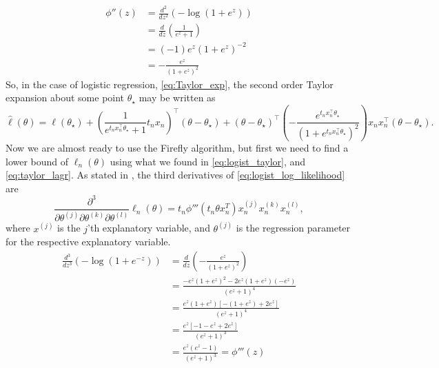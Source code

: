 \begin{equation}\label{eq:loglist_second_der}
    \begin{split}
       \phi''\left(z\right) & = \frac{d^2}{dz^2}\left(-\log\left(1 + e^z \right)\right) \\
        & = \frac{d}{dz} \left(\frac{1}{e^z +1}\right) \\
        & = \left(-1\right)e^z \left(1 + e^z\right)^{-2} \\
        & = -\frac{e^z}{\left(1 + e^z\right)^2} 
\end{split} 
\end{equation}
So, in the case of logistic regression, \eqref{eq:Taylor_exp}, the second order Taylor expansion about some point $\theta_{\star}$ may be written as 
\begin{equation}\label{eq:logist_taylor}
    \hat{\ell}\left(\theta\right)= \ell\left(\theta_{\star}\right) + \left(\frac{1}{e^{t_n x_n^{\top}\theta_{\star} } + 1} t_n x_n\right)^{\top}
    \left(\theta - \theta_{\star} \right) 
    + \left(\theta - \theta_{\star}\right)^{\top}
    \left(-\frac{e^{t_n x_n^{\top}\theta_{\star} }}{\left(1 + e^{t_n x_n^{\top}\theta_{\star} }\right)^2}\right)x_n x_n^{\top} \left(\theta - \theta_{\star}\right).  
\end{equation}{}
Now we are almost ready to use the Firefly algorithm, but first we need to find a lower bound of $\ell_n\left(\theta\right)$ using what we found in \eqref{eq:logist_taylor}, and \eqref{eq:taylor_lagr}.  
As stated in \cite{Bardenet:1}, the third derivatives of \eqref{eq:logist_log_likelihood} are 
\begin{equation}\label{eq:logist_third_der}
    \frac{\partial^3}{\partial\theta^{\left(j\right)}\partial \theta^{\left(k\right)}\partial\theta^{\left(l\right)}}  \ell_n\left(\theta\right)= t_n \phi'''\left(t_n\theta x_n^T\right) x_n^{\left(j\right)}x_n^{\left(k\right)}x_n^{\left(l\right)},
\end{equation} where $x^{\left(j\right)}$ is the $j$'th explanatory variable, and $\theta^{\left(j\right)}$ is the regression parameter for the respective explanatory variable. 
\begin{equation*}
\begin{split}
    \frac{d^3}{dz^3}\left( -\log\left(1 + e^{-z}\right)\right) &= \frac{d}{dz}\left( - \frac{e^z}{\left(1 + e^z\right)^2}\right) \\
    & = \frac{- e^z \left(1 + e^z\right)^2 - 2e^z\left(1 + e^z\right)\left(-e^z\right)}{\left(e^z + 1\right)^4}\\
    &=\frac{e^z\left(1+e^z\right)\left[-\left(1 + e^z\right) + 2e^z\right]}{\left(e^z + 1\right)^4} \\
    &= \frac{e^z\left[-1 -e^z + 2e^z\right]}{\left(e^z + 1\right)^3} \\
    &= \frac{e^z \left(e^z -1\right)}{\left(e^z + 1 \right)^3} = \phi '''\left(z\right)
\end{split}
\end{equation*}   
